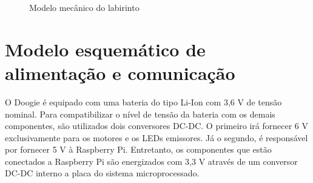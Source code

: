 \begin{figure}[H]
	\centering
	\caption{Modelo mecânico do labirinto}
	\label{fig:modelo_mecanico_labirinto}
\end{figure}

\section{Modelo esquemático de alimentação e comunicação}
\label{sec:arquitetura_eletrica_geral}
O Doogie é equipado com uma bateria do tipo Li-Ion com 3,6 V de tensão nominal. Para compatibilizar o nível de tensão da bateria com os demais componentes, são utilizados dois conversores DC-DC. O primeiro irá fornecer 6 V exclusivamente para os motores e os LEDs emissores. Já o segundo, é responsável por fornecer 5 V à Raspberry Pi. Entretanto, os componentes que estão conectados a Raspberry Pi são energizados com 3,3 V através de um conversor DC-DC interno a placa do sistema microprocessado.

